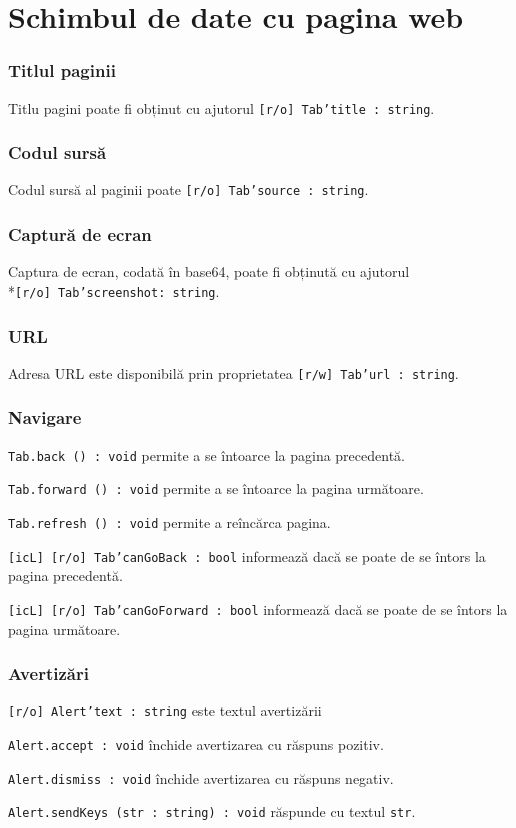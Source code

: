 \section{Schimbul de date cu pagina web}
\label{dataexchange}

\subsubsection{Titlul paginii}

Titlu pagini poate fi obținut cu ajutorul \texttt{[r/o] Tab'title : string}.

\subsubsection{Codul sursă}

Codul sursă al paginii poate \texttt{[r/o] Tab'source : string}.

\subsubsection{Captură de ecran}

Captura de ecran, codată în base64, poate fi obținută cu ajutorul \\*\texttt{[r/o] Tab'screenshot: string}.

\subsubsection{URL}

Adresa URL este disponibilă prin proprietatea \texttt{[r/w] Tab'url : string}.

\subsubsection{Navigare}

\texttt{Tab.back () : void} permite a se întoarce la pagina precedentă.

\texttt{Tab.forward () : void} permite a se întoarce la pagina următoare.

\texttt{Tab.refresh () : void}  permite a reîncărca pagina.

\texttt{[icL] [r/o] Tab'canGoBack : bool} informează dacă se poate de se întors la pagina precedentă.

\texttt{[icL] [r/o] Tab'canGoForward : bool} informează dacă se poate de se întors la pagina următoare.


\subsubsection{Avertizări}

\texttt{[r/o] Alert'text : string} este textul avertizării

\texttt{Alert.accept : void} închide avertizarea cu răspuns pozitiv.

\texttt{Alert.dismiss : void} închide avertizarea cu răspuns negativ.

\texttt{Alert.sendKeys (str : string) : void} răspunde cu textul \texttt{str}.

